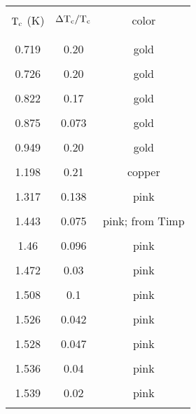 {\newpage
\clearpage
\samepage \begin{figure}\vspace{12cm}

\label{tcdef}
\end{figure}
}

{\newpage
\clearpage
\samepage \begin{table}
\label{tcfreq}
\begin{center}
\begin{tabular}{|ccc|}
\hline
& & \\ 
$\rm T_c$ (K) & $\rm \Delta T_c/ T_c$ & color \\ 
& & \\ 
\hline
& & \\ 
0.719 & 0.20 & gold \\ 	%
& & \\ 
0.726 & 0.20 & gold \\   %
& & \\ 
0.822 & 0.17 & gold \\ 	%
& & \\ 
0.875 & 0.073 & gold \\  %
& & \\ 
0.949 & 0.20   & gold \\   %
& & \\ 
1.198 & 0.21 & copper \\ 	%
& & \\ 
1.317 & 0.138  & pink \\ 	%
& & \\ 
1.443 & 0.075  & pink; from Timp \\  %
& & \\ 
1.46 & 0.096 & pink \\ 	%
& & \\ 
1.472 & 0.03 & pink \\ 	%
& & \\ 
1.508 & 0.1 & pink \\   %
& & \\ 
1.526 & 0.042 & pink \\ 	%
& & \\ 
1.528 & 0.047 & pink \\ 	%
& & \\ 
1.536 & 0.04 & pink \\ 	%
& & \\ 
1.539 & 0.02 & pink \\ 	%
& & \\ 
\hline
\end{tabular}
\end{center}
\end{table}
}

